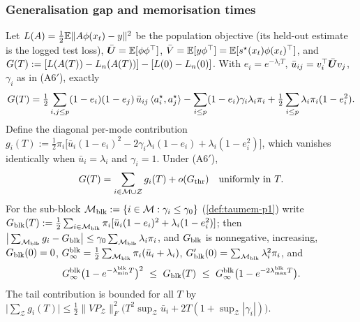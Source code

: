 \subsubsection{Generalisation gap and memorisation times}

\begin{proposition}\label{prop:gap-p1}
Let $L(A)=\tfrac12\mathbb{E}\|A\phi(x_t)-y\|^2$ be the population objective (its held-out estimate is the logged test loss), $\bar{\bm{U}}=\mathbb{E}[\phi\phi^{\top}]$, $\bar V=\mathbb{E}[y\phi^{\top}]=\mathbb{E}[s^\star(x_t)\phi(x_t)^{\top}]$, and $G(T):=[L(A(T))-L_{n}(A(T))]-[L(0)-L_{n}(0)]$. With $e_i=e^{-\lambda_iT}$, $\bar u_{ij}=v_i^{\top}\bar{\bm{U}} v_j$, $\gamma_i$ as in (A6$'$), exactly
\begin{equation}\label{eq:gap-exact-p1}
G(T)=\tfrac12\sum_{i,j\le p}(1-e_i)(1-e_j)\,\bar u_{ij}\,\langle a_i^\star,a_j^\star\rangle-\sum_{i\le p}(1-e_i)\gamma_i\lambda_i\pi_i+\tfrac12\sum_{i\le p}\lambda_i\pi_i(1-e_i^2).
\end{equation}
Define the diagonal per-mode contribution $g_i(T):=\tfrac12\pi_i\big[\bar u_i(1-e_i)^2-2\gamma_i\lambda_i(1-e_i)+\lambda_i(1-e_i^2)\big]$, which vanishes identically when $\bar u_i=\lambda_i$ and $\gamma_i=1$. Under (A6$'$),
\[
G(T)=\sum_{i\in\mathcal M\cup\mathcal Z}g_i(T)+o(G_{\rm thr})\quad\text{uniformly in }T .
\]
For the sub-block $\mathcal M_{\rm blk}:=\{i\in\mathcal M:\gamma_i\le\gamma_0\}$ (\cref{def:taumem-p1}) write $G_{\rm blk}(T):=\tfrac12\sum_{i\in\mathcal M_{\rm blk}}\pi_i[\bar u_i(1-e_i)^2+\lambda_i(1-e_i^2)]$; then $\big|\sum_{\mathcal M_{\rm blk}}g_i-G_{\rm blk}\big|\le\gamma_0\sum_{\mathcal M_{\rm blk}}\lambda_i\pi_i$, and $G_{\rm blk}$ is nonnegative, increasing, $G_{\rm blk}(0)=0$, $G_\infty^{\rm blk}=\tfrac12\sum_{\mathcal M_{\rm blk}}\pi_i(\bar u_i+\lambda_i)$, $G_{\rm blk}'(0)=\sum_{\mathcal M_{\rm blk}}\lambda_i^2\pi_i$, and
\begin{equation}\label{eq:gap-bounds-p1}
G_\infty^{\rm blk}\big(1-e^{-\lambda^{\rm blk}_{\min}T}\big)^2\ \le\ G_{\rm blk}(T)\ \le\ G_\infty^{\rm blk}\big(1-e^{-2\lambda^{\rm blk}_{\max}T}\big).
\end{equation}
The tail contribution is bounded for all $T$ by $\big|\sum_{\mathcal Z}g_i(T)\big|\le\tfrac12\|VP_{\mathcal Z}\|_F^2\big(T^2\sup_{\mathcal Z}\bar u_i+2T(1+\sup_{\mathcal Z}|\gamma_i|)\big)$.
\end{proposition}
